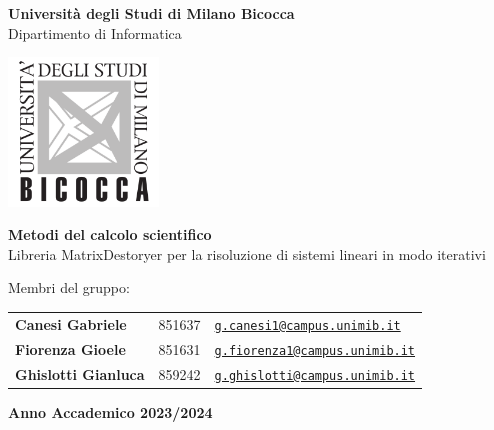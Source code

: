 \begin{center}
	{\LARGE \textbf{Università degli Studi di Milano Bicocca}} \\
	\vspace{0.2cm}
	{\Large {Dipartimento di Informatica}} \\ 
	\vspace{1cm}
	
	\includegraphics[width=4cm]{figures/unimib-logo.png} \\
	\vspace{0.4cm}
	
	{\huge \textbf{Metodi del calcolo scientifico}} \\ 
	\Large{Libreria MatrixDestoryer per la risoluzione di sistemi lineari in modo iterativi}
	\vspace{1cm}
\end{center}
\vspace{2cm}

\noindent \large{Membri del gruppo:} 

\begin{tabular}{@{}lll}
	\textbf{Canesi Gabriele} & 851637 & \href{mailto:g.canesi1@campus.unimib.it}{\texttt{g.canesi1@campus.unimib.it}}\\
	\textbf{Fiorenza Gioele} & 851631 & \href{mailto:g.fiorenza1@campus.unimib.it}{\texttt{g.fiorenza1@campus.unimib.it}}\\
	\textbf{Ghislotti Gianluca} & 859242 & \href{mailto:g.ghislotti@campus.unimib.it}{\texttt{g.ghislotti@campus.unimib.it}}\\
\end{tabular}

\vfill
\begin{center}
	\large{\textbf{Anno Accademico 2023/2024}}
\end{center}



